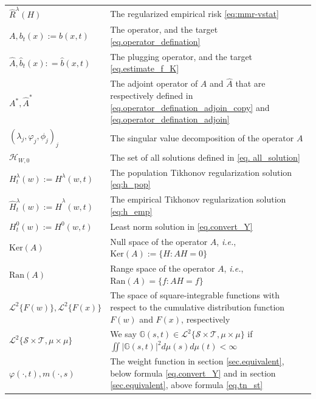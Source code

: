 \documentclass[
  12pt]{article}
\def\wh{\widehat}
\def\mG{\mathbb{G}}
\def\cH{\mathcal{H}}
\def\cL{\mathcal{L}}
\def\cS{\mathcal{S}}
\def\cT{\mathcal{T}}
\begin{document}
{\begin{longtable}{ >{\centering\arraybackslash}m{3.4cm} | >{\centering\arraybackslash}m{12.2cm} }
$\wh{R}^{\lambda}(H)$ & The regularized empirical risk \eqref{eq:mmr-vstat} \\

$A, b_t(x):=b(x,t)$ & The operator, and the target \eqref{eq.operator_defination} \\

$\wh{A}, \wh{b}_t(x): =\wh{b}(x,t)$ & The plugging operator, and the target \eqref{eq.estimate_f_K} \\

$A^*, \wh{A}^*$ & The adjoint operator of $A$ and $\wh{A}$ that are respectively defined in \eqref{eq.operator_defination_adjoin_copy} and \eqref{eq.operator_defination_adjoin} \\

$(\lambda_{j},\varphi_{j},\phi_{j})_{j}$ &  The singular value decomposition of the operator $A$ \\

$\cH_{W,0}$ & The set of all
solutions defined in \eqref{eq. all_solution} \\

$H^{\lambda}_t(w):=H^{\lambda}(w,t)$ & The population Tikhonov
regularization solution \eqref{eq:h_pop} \\

$\wh{H}^{\lambda}_t(w):=\wh{H}^{\lambda}(w,t)$ & The empirical Tikhonov
regularization solution \eqref{eq:h_emp} \\

$H^0_t(w):=H^0(w,t)$ & Least norm solution in \eqref{eq.convert_Y} \\

$\mathrm{Ker}(A)$ & Null space of the operator $A$, \emph{i.e.}, $\mathrm{Ker}(A):=\{H:AH=0\}$ \\

$\mathrm{Ran}(A)$ & Range space of the operator $A$, \emph{i.e.}, $\mathrm{Ran}(A)=\{f:AH=f\}$ \\


\hline

$\cL^2\{F(w)\},\cL^2\{F(x)\}$ & The space of square-integrable functions with respect to the cumulative distribution function $F(w)$ and $F(x)$, respectively \\

$\mathcal{L}^{2}\{\cS \times \cT,\mu \times \mu\}$ & We say $\mG(s,t) \in \mathcal{L}^{2}\{\cS \times \cT,\mu \times \mu\}$ if $\iint |\mG(s,t)|^2 d\mu(s)d\mu(t) < \infty$ \\


$\varphi(\cdot,t),m(\cdot,s)$ & The weight function in section \ref{sec.equivalent}, below formula \eqref{eq.convert_Y} and in section \ref{sec.equivalent}, above formula \eqref{eq.tn_st}   \\


\end{longtable}}
\end{document}
